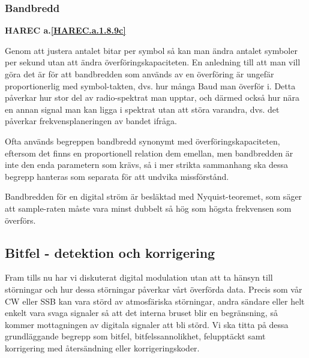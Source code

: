\subsubsection{Bandbredd}
\textbf{HAREC a.\ref{HAREC.a.1.8.9c}\label{myHAREC.a.1.8.9c}}
\begin{rev-nytt}[MAD]

Genom att justera antalet bitar per symbol så kan man ändra antalet symboler
per sekund utan att ändra överföringskapaciteten. En anledning till att man
vill göra det är för att bandbredden som används av en överföring är ungefär
proportionerlig med symbol-takten, dvs. hur många Baud man överför i.
Detta påverkar hur stor del av radio-spektrat man upptar, och därmed också hur
nära en annan signal man kan ligga i spektrat utan att störa varandra, dvs.
det påverkar frekvensplaneringen av bandet ifråga.

Ofta används begreppen bandbredd synonymt med överföringskapaciteten, eftersom
det finns en proportionell relation dem emellan, men bandbredden är inte den
enda parametern som krävs, så i mer strikta sammanhang ska dessa begrepp
hanteras som separata för att undvika missförstånd.

Bandbredden för en digital ström är besläktad med Nyquist-teoremet, som säger
att sample-raten måste vara minst dubbelt så hög som högsta frekvensen som
överförs.

\end{rev-nytt}

\subsection{Bitfel - detektion och korrigering}
\begin{rev-nytt}[MAD]

Fram tills nu har vi diskuterat digital modulation utan att ta hänsyn till
störningar och hur dessa störningar påverkar vårt överförda data. Precis som
vår CW eller SSB kan vara störd av atmosfäriska störningar, andra sändare
eller helt enkelt vara svaga signaler så att det interna bruset blir en
begränsning, så kommer mottagningen av digitala signaler att bli störd.
Vi ska titta på dessa grundläggande begrepp som bitfel, bitfelssannolikhet,
felupptäckt samt korrigering med återsändning eller korrigeringskoder.

\end{rev-nytt}

